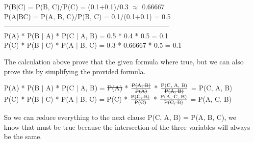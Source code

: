 \documentclass{article}
\begin{document}
\begin{enumerate}[label=(\alph*)]
{\begin{center}
            P(B$|$C) = P(B, C)/P(C) = (0.1+0.1)/0.3 $\approx$ 0.66667 \\
            P(A$|$BC) = P(A, B, C)/P(B, C) = 0.1/(0.1+0.1) = 0.5 \\
            ------------------------------------------------------------------------ \\
            P(A) * P(B $|$ A) * P(C $|$ A, B) = 0.5 * 0.4 * 0.5 = 0.1 \\
            P(C) * P(B $|$ C) * P(A $|$ B, C) = 0.3 * 0.66667 * 0.5 = 0.1 \\
        \end{center}
        The calculation above prove that the given formula where true, but we can also prove this by 
        simplifying the provided formula.
        \begin{center}
            P(A) * P(B $|$ A) * P(C $|$ A, B) = \st{P(A)} * $\frac{\text{\st{P(A, B)}}}{\text{\st{P(A)}}}$ * $\frac{\text{P(C, A, B)}}{\text{\st{P(A, B)}}}$ = P(C, A, B) \\
            P(C) * P(B $|$ C) * P(A $|$ B, C) = \st{P(C)} * $\frac{\text{\st{P(C, B)}}}{\text{\st{P(C)}}}$ * $\frac{\text{P(A, C, B)}}{\text{\st{P(C, B)}}}$ = P(A, C, B) \\
        \end{center}
        So we can reduce everything to the next clause P(C, A, B) = P(A, B, C), we know that must be true 
        because the intersection of the three variables will always be the same.
    }
\end{enumerate}

\clearpage
\end{document}
